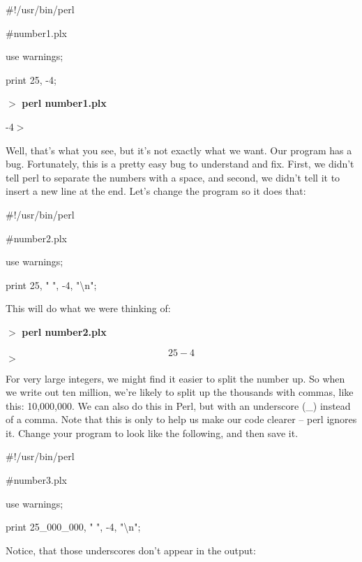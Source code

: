 \documentclass[a4paper,11pt]{book}
\begin{document}
\noindent 

\noindent \#!/usr/bin/perl

\noindent \#number1.plx

\noindent use warnings;

\noindent print 25, -4;

\noindent 

\noindent $>$ \textbf{perl number1.plx}

-4$>$

\noindent 

\noindent Well, that's what you see, but it's not exactly what we want. Our program has a bug. Fortunately, this is a pretty easy bug to understand and fix. First, we didn't tell perl to separate the numbers with a space, and second, we didn't tell it to insert  a new line at the end. Let's change the program so it does that:

\noindent 

\noindent \#!/usr/bin/perl

\noindent \#number2.plx

\noindent use warnings;

\noindent print 25, " ", -4, "\textbackslash n";

\noindent 

\noindent This will do what we were thinking of:

\noindent 

\noindent $>$ \textbf{perl number2.plx}

\[25 -4\] 
$>$

\noindent 

\noindent For very large integers, we might find it easier to split the number up. So when we write out ten million, we're likely to split up the thousands with commas, like this: 10,000,000. We can also do this in Perl, but with an underscore (\_) instead of a comma. Note that this is only to help us make our code clearer -- perl ignores it. Change your program to look like the following, and then save it.

\noindent 

\noindent \#!/usr/bin/perl

\noindent \#number3.plx

\noindent use warnings;

\noindent print 25\_000\_000, " ", -4, "\textbackslash n";

\noindent 

\noindent 

\noindent Notice, that those underscores don't appear in the output:
\end{document}
